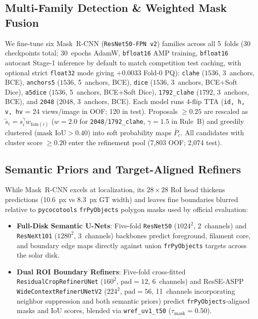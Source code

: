 \documentclass[sigconf]{acmart}
\begin{document}
    \subsection{Multi-Family Detection \& Weighted Mask Fusion}
    We fine-tune six Mask~R-CNN (\texttt{ResNet50-FPN v2}) families \cite{he2017mask,he2016deep} across all 5~folds (30 checkpoints total; 30~epochs AdamW, \texttt{bfloat16} AMP training, \texttt{bfloat16} autocast Stage-1 inference by default to match competition test caching, with optional strict \texttt{float32} mode giving $+0.0033$ Fold-0 PQ): \texttt{clahe} ($1536$, 3~anchors, BCE), \texttt{anchors5} ($1536$, 5~anchors, BCE), \texttt{dice} ($1536$, 3~anchors, BCE+Soft Dice), \texttt{a5dice} ($1536$, 5~anchors, BCE+Soft Dice), \texttt{1792\_clahe} ($1792$, 3~anchors, BCE), and \texttt{2048} ($2048$, 3~anchors, BCE). Each model runs 4-flip TTA (\texttt{id, h, v, hv} = 24 views/image in OOF; 120 in test). Proposals $\ge 0.25$ are rescaled as $\tilde{s}_i = s_i^\gamma w_{\text{fam}(i)}$ ($w=2.0$ for \texttt{2048}/\allowbreak\texttt{1792\_clahe}, $\gamma=1.5$ in Rule~B) and greedily clustered ($\text{mask IoU} > 0.40$) into soft probability maps $\bar{P}_c$. All candidates with cluster score $\ge 0.20$ enter the refinement pool (7,803 OOF; 2,074 test).

    \subsection{Semantic Priors and Target-Aligned Refiners}
    While Mask~R-CNN excels at localization, its $28\times 28$ RoI head thickens predictions (10.6~px vs 8.3~px GT width) and leaves fine boundaries blurred relative to \texttt{pycocotools} \texttt{frPyObjects} polygon masks used by official evaluation:
    \begin{itemize}
        \item \textbf{Full-Disk Semantic U-Nets}: Five-fold \texttt{ResNet50} ($1024^2$, 2~channels) and \texttt{ResNeXt101} ($1280^2$, 3~channels) \cite{xie2017aggregated,ronneberger2015u} backbones predict foreground, filament core, and boundary edge maps directly against union \texttt{frPyObjects} targets across the solar disk.
        \item \textbf{Dual ROI Boundary Refiners}: Five-fold cross-fitted \texttt{Residual\allowbreak CropRefinerUNet} ($160^2$, $\text{pad}=12$, 6~channels) and ResSE-ASPP \texttt{WideContext\allowbreak RefinerUNetV2} ($224^2$, $\text{pad}=56$, 11~channels incorporating neighbor suppression and both semantic priors) predict \texttt{frPyObjects}-aligned masks and IoU scores, blended via \texttt{wref\_\allowbreak uv1\_t50} ($\tau_{\text{mask}}=0.50$).
    \end{itemize}
\end{document}

